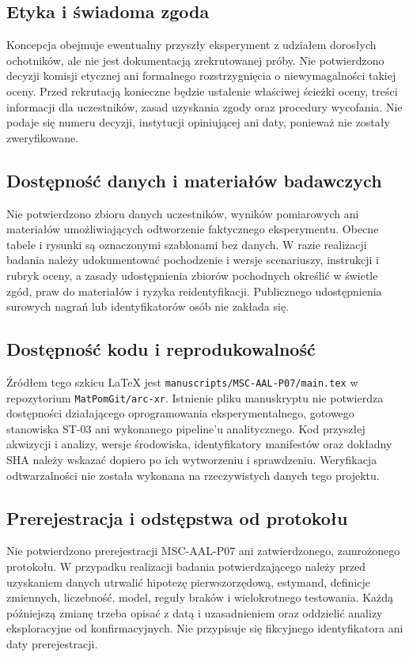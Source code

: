 \documentclass[11pt,a4paper]{article}
\begin{document}
\subsection*{Etyka i świadoma zgoda}
Koncepcja obejmuje ewentualny przyszły eksperyment z udziałem dorosłych ochotników, ale nie jest dokumentacją zrekrutowanej próby. Nie potwierdzono decyzji komisji etycznej ani formalnego rozstrzygnięcia o niewymagalności takiej oceny. Przed rekrutacją konieczne będzie ustalenie właściwej ścieżki oceny, treści informacji dla uczestników, zasad uzyskania zgody oraz procedury wycofania. Nie podaje się numeru decyzji, instytucji opiniującej ani daty, ponieważ nie zostały zweryfikowane.

\subsection*{Dostępność danych i materiałów badawczych}
Nie potwierdzono zbioru danych uczestników, wyników pomiarowych ani materiałów umożliwiających odtworzenie faktycznego eksperymentu. Obecne tabele i rysunki są oznaczonymi szablonami bez danych. W razie realizacji badania należy udokumentować pochodzenie i wersje scenariuszy, instrukcji i rubryk oceny, a zasady udostępnienia zbiorów pochodnych określić w świetle zgód, praw do materiałów i ryzyka reidentyfikacji. Publicznego udostępnienia surowych nagrań lub identyfikatorów osób nie zakłada się.

\subsection*{Dostępność kodu i reprodukowalność}
Źródłem tego szkicu LaTeX jest \texttt{manuscripts/MSC-AAL-P07/main.tex} w repozytorium \texttt{MatPomGit/arc-xr}. Istnienie pliku manuskryptu nie potwierdza dostępności działającego oprogramowania eksperymentalnego, gotowego stanowiska ST-03 ani wykonanego pipeline'u analitycznego. Kod przyszłej akwizycji i analizy, wersje środowiska, identyfikatory manifestów oraz dokładny SHA należy wskazać dopiero po ich wytworzeniu i sprawdzeniu. Weryfikacja odtwarzalności nie została wykonana na rzeczywistych danych tego projektu.

\subsection*{Prerejestracja i odstępstwa od protokołu}
Nie potwierdzono prerejestracji MSC-AAL-P07 ani zatwierdzonego, zamrożonego protokołu. W przypadku realizacji badania potwierdzającego należy przed uzyskaniem danych utrwalić hipotezę pierwszorzędową, estymand, definicje zmiennych, liczebność, model, reguły braków i wielokrotnego testowania. Każdą późniejszą zmianę trzeba opisać z datą i uzasadnieniem oraz oddzielić analizy eksploracyjne od konfirmacyjnych. Nie przypisuje się fikcyjnego identyfikatora ani daty prerejestracji.
\end{document}
